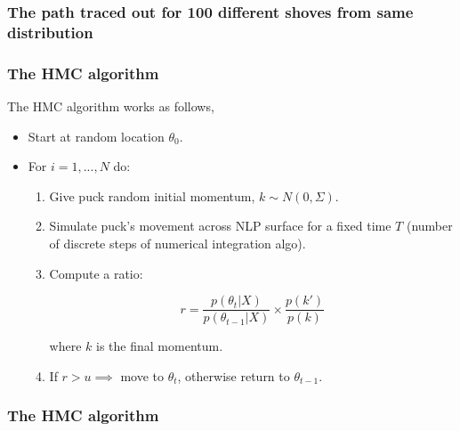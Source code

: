 \documentclass[handout]{beamer}
\begin{document}
\begin{frame}
	\frametitle{The path traced out for 100 different shoves from same distribution}
	
	\begin{figure}[t]
		\centerline{}
	\end{figure}
	
\end{frame}

\begin{frame}
	\frametitle{The HMC algorithm}
	 The HMC algorithm works as follows,
	
	\begin{itemize}
		\item<3-> Start at random location $\theta_0$.
		\item<4-> For $i=1,...,N$ do:
		\begin{enumerate}
			\item<5-> Give puck random initial momentum, $k\sim N(0,\Sigma)$.
			\item<6-> Simulate puck's movement across NLP surface for a fixed time $T$ (number of discrete steps of numerical integration algo).
			\item<7-> Compute a ratio:
			
			\begin{equation}
			r = \frac{p(\theta_t|X)}{p(\theta_{t-1}|X)} \times \frac{p(k')}{p(k)}
			\end{equation}
			
			where $k$ is the final momentum.
			
			\item<8-> If $r > u \implies$ move to $\theta_{t}$, otherwise return to $\theta_{t-1}$.
		\end{enumerate}
	\end{itemize}
	
\end{frame}

\begin{frame}
	\frametitle{The HMC algorithm}
	
	\begin{figure}[t]
		\centerline{}
	\end{figure}
	
\end{frame}
\end{document}
